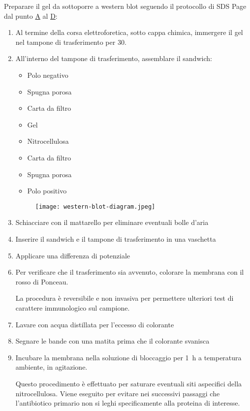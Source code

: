 Preparare il gel da sottoporre a western blot seguendo il protocollo di SDS Page dal punto \hyperref[ssec:sds-page-protocolloA]{A} al \hyperref[ssec:sds-page-protocolloD]{D}:
\begin{enumerate}
	\item Al termine della corsa elettroforetica, sotto cappa chimica, immergere il gel nel tampone di trasferimento per \qty{30}{\sec}.
	\item All’interno del tampone di trasferimento, assemblare il sandwich:

	      \begin{minipage}[b]{0.35\textwidth}
		      \begin{itemize}[person]
			      \item Polo negativo
			      \item Spugna porosa
			      \item Carta da filtro
			      \item Gel
			      \item Nitrocellulosa
			      \item Carta da filtro
			      \item Spugna porosa
			      \item Polo positivo
		      \end{itemize}
	      \end{minipage}
	      \begin{minipage}[b]{0.6\textwidth}
		      \begin{figure}[H]
			      \texttt{[image: western-blot-diagram.jpeg]}
		      \end{figure}
	      \end{minipage}

	\item Schiacciare con il mattarello per eliminare eventuali bolle d’aria
	\item Inserire il sandwich e il tampone di trasferimento in una vaschetta
	\item Applicare una differenza di potenziale
	\item Per verificare che il trasferimento sia avvenuto, colorare la membrana con il rosso di Ponceau.
	      \begin{Note}
		      La procedura è reversibile e non invasiva per permettere ulteriori test di carattere immunologico sul campione.
	      \end{Note}
	\item Lavare con acqua distillata per l'eccesso di colorante
	\item Segnare le bande con una matita prima che il colorante svanisca
	\item Incubare la membrana nella soluzione di bloccaggio per \qty{1}{\hour} a temperatura ambiente, in agitazione. 
	\begin{Note}
		Questo procedimento è effettuato per saturare eventuali siti aspecifici della nitrocellulosa. Viene eseguito per evitare nei successivi passaggi che l'antibiotico primario non si leghi specificamente alla proteina di interesse. 
	\end{Note}


\end{enumerate}
